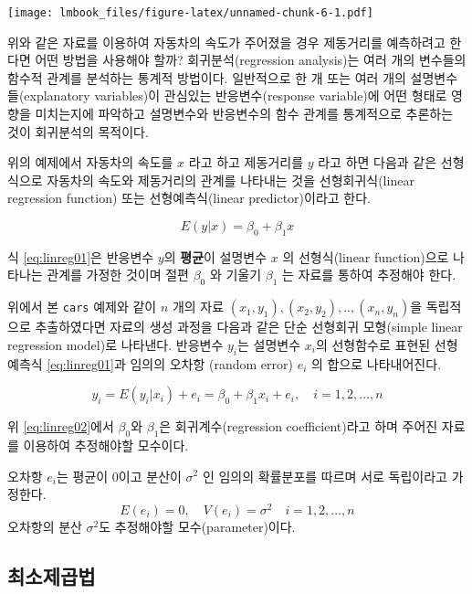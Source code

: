 \documentclass[
]{book}
\theoremstyle{definition}
\theoremstyle{definition}
\theoremstyle{definition}
\theoremstyle{remark}
\begin{document}
\texttt{[image: lmbook\_files/figure-latex/unnamed-chunk-6-1.pdf]}

위와 같은 자료를 이용하여 자동차의 속도가 주어졌을 경우 제동거리를 예측하려고 한다면 어떤 방법을 사용해야 할까? 회귀분석(regression analysis)는 여러 개의 변수들의 함수적 관계를 분석하는 통계적 방법이다. 일반적으로 한 개 또는 여러 개의 설명변수들(explanatory variables)이 관심있는 반응변수(response variable)에 어떤 형태로 영향을 미치는지에 파악하고 설명변수와 반응변수의 함수 관계를 통계적으로 추론하는 것이 회귀분석의 목적이다.

위의 예제에서 자동차의 속도를 \(x\) 라고 하고 제동거리를 \(y\) 라고 하면 다음과 같은 선형식으로 자동차의 속도와 제동거리의 관계를 나타내는 것을 선형회귀식(linear regression function) 또는 선형예측식(linear predictor)이라고 한다.

\begin{equation} 
E(y|x) = \beta_0 + \beta_1 x
\label{eq:linreg01}
\end{equation}

식 \eqref{eq:linreg01}은 반응변수 \(y\)의 \textbf{평균}이 설명변수 \(x\) 의 선형식(linear function)으로 나타나는 관계를 가정한 것이며 절편 \(\beta_0\) 와 기울기 \(\beta_1\) 는 자료를 통하여 추정해야 한다.

위에서 본 \texttt{cars} 예제와 같이 \(n\) 개의 자료 \((x_1,y_1),(x_2,y_2),..,(x_n, y_n)\)을 독립적으로 추출하였다면 자료의 생성 과정을 다음과 같은 단순 선형회귀 모형(simple linear regression model)로 나타낸다. 반응변수 \(y_i\)는 설명변수 \(x_i\)의 선형함수로 표현된 선형 예측식 \eqref{eq:linreg01}과 임의의 오차항 (random error) \(e_i\) 의 합으로 나타내어진다.

\begin{equation} 
y_i = E(y_i | x_i) + e_i = \beta_0 + \beta_1 x_i + e_i, \quad i=1,2,\dots,n
\label{eq:linreg02}
\end{equation}

위 \eqref{eq:linreg02}에서 \(\beta_0\)와 \(\beta_1\)은 회귀계수(regression coefficient)라고 하며 주어진 자료를 이용하여 추정해야할 모수이다.

오차항 \(e_i\)는 평균이 \(0\)이고 분산이 \(\sigma^2\) 인 임의의 확률분포를 따르며 서로 독립이라고 가정한다.\\
\[ E(e_i)=0, \quad V(e_i) = \sigma^2 \quad i=1,2,\dots,n \]
오차항의 분산 \(\sigma^2\)도 추정해야할 모수(parameter)이다.

\hypertarget{lse}{%
\subsection{최소제곱법}\label{lse}}
\end{document}
